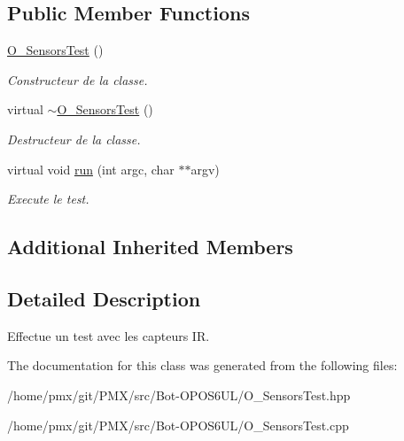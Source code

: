\subsection*{Public Member Functions}
\begin{DoxyCompactItemize}
\item 
\mbox{\label{classO__SensorsTest_af2e518d8798cad17ed89ad408377a063}} 
\hyperlink{classO__SensorsTest_af2e518d8798cad17ed89ad408377a063}{O\+\_\+\+Sensors\+Test} ()
\begin{DoxyCompactList}\small\item\em Constructeur de la classe. \end{DoxyCompactList}\item 
\mbox{\label{classO__SensorsTest_abe053c1e54688bbf73a546140afb852b}} 
virtual \hyperlink{classO__SensorsTest_abe053c1e54688bbf73a546140afb852b}{$\sim$\+O\+\_\+\+Sensors\+Test} ()
\begin{DoxyCompactList}\small\item\em Destructeur de la classe. \end{DoxyCompactList}\item 
\mbox{\label{classO__SensorsTest_ae3b998034225e16586ded4ba3bd419e5}} 
virtual void \hyperlink{classO__SensorsTest_ae3b998034225e16586ded4ba3bd419e5}{run} (int argc, char $\ast$$\ast$argv)
\begin{DoxyCompactList}\small\item\em Execute le test. \end{DoxyCompactList}\end{DoxyCompactItemize}
\subsection*{Additional Inherited Members}


\subsection{Detailed Description}
Effectue un test avec les capteurs IR. 

The documentation for this class was generated from the following files\+:\begin{DoxyCompactItemize}
\item 
/home/pmx/git/\+P\+M\+X/src/\+Bot-\/\+O\+P\+O\+S6\+U\+L/O\+\_\+\+Sensors\+Test.\+hpp\item 
/home/pmx/git/\+P\+M\+X/src/\+Bot-\/\+O\+P\+O\+S6\+U\+L/O\+\_\+\+Sensors\+Test.\+cpp\end{DoxyCompactItemize}
